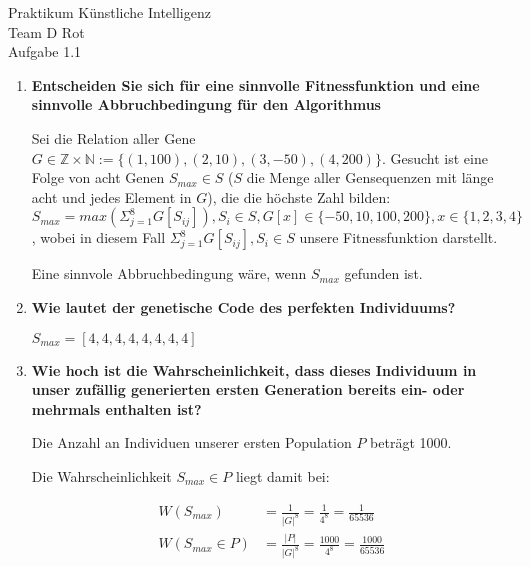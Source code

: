 \documentclass[12pt, twoside]{article}
\begin{document}
\begin{center}
  \Huge{Praktikum Künstliche Intelligenz} \\
  \huge{Team D Rot} \\
  \Large{Aufgabe 1.1} \\
\end{center}

\begin{enumerate}[label={\textbf{\alph*)}}]

  \item \textbf{Entscheiden Sie sich f\"ur eine sinnvolle
          Fitnessfunktion und eine sinnvolle
          Abbruchbedingung f\"ur den Algorithmus}

        Sei die Relation aller Gene $G \in \mathbb{Z}
        \times \mathbb{N} := \{(1,100), (2,10), (3, -50),
        (4, 200)\}$. Gesucht ist eine Folge von acht Genen
        $S_{max} \in S$ ($S$ die Menge aller Gensequenzen
        mit l\"ange acht und jedes Element in $G$), die die
        h\"ochste Zahl bilden:
        $S_{max} = max(\Sigma_{j=1}^{8} G[S_{ij}]), S_{i}
        \in S, G[x] \in \{-50,10,100,200\}, x \in \{1,2,3,4
        \}$, wobei in diesem Fall
        $\Sigma_{j=1}^{8} G[S_{ij}],S_{i} \in S$ unsere
        Fitnessfunktion darstellt.

        Eine sinnvole Abbruchbedingung w\"are, wenn
        $S_{max}$ gefunden ist.

  \item \textbf{Wie lautet der genetische Code des
          perfekten Individuums?}

        $S_{max} = [4, 4, 4, 4, 4, 4, 4, 4]$

  \item \textbf{Wie hoch ist die Wahrscheinlichkeit, dass
          dieses Individuum in unser zuf\"allig generierten
          ersten Generation bereits ein- oder mehrmals
          enthalten ist?}

        Die Anzahl an Individuen unserer ersten Population
        $P$ betr\"agt 1000.

        Die Wahrscheinlichkeit $S_{max} \in P$ liegt damit
        bei:

        \begin{align*}
          W(S_{max}) &= \frac{1}{|G|^{8}} = \frac{1}{4^8}
                     = \frac{1}{65536} \\
          W(S_{max} \in P) &= \frac{|P|}{|G|^{8}} =
                      \frac{1000}{4^8} = \frac{1000}{65536}
        \end{align*}


\end{enumerate}
\end{document}
